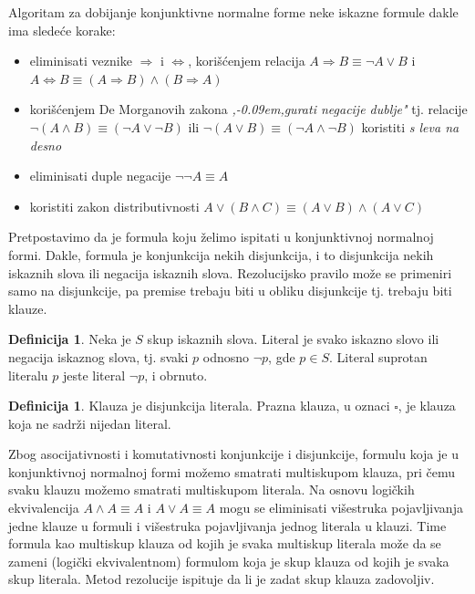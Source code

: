 \documentclass[12pt, a4paper, titlepage, twoside]{article}
\theoremstyle{definition}
\newtheorem{defn}[theorem]{Definicija}
\def\zn{,\kern-0.09em,}
\begin{document}
Algoritam za dobijanje konjunktivne normalne forme neke iskazne formule
dakle ima slede\'ce korake:
\begin{itemize}
	\item eliminisati veznike $\Rightarrow$ i $\Leftrightarrow$, kori\v s\'cenjem relacija $A \Rightarrow B \equiv \neg A \lor B$ i $A \Leftrightarrow B \equiv (A \Rightarrow B) \land (B \Rightarrow A)$
	\item kori\v s\'cenjem De Morganovih zakona \emph{\zn gurati negacije dublje"} tj. relacije $\neg (A \land B) \equiv (\neg A \lor \neg B)$ ili $\neg (A \lor B) \equiv (\neg A \land \neg B)$ koristiti \emph{s leva na desno}
	\item eliminisati duple negacije $\neg \neg A \equiv A$
	\item koristiti zakon distributivnosti $A \lor (B \land C) \equiv (A \lor B) \land (A \lor C)$
\end{itemize}


Pretpostavimo da je formula koju \v zelimo ispitati u konjunktivnoj normalnoj formi. Dakle, 
formula je konjunkcija nekih disjunkcija, i to disjunkcija nekih iskaznih slova ili 
negacija iskaznih slova. Rezolucijsko pravilo mo\v ze se primeniri samo na disjunkcije, 
pa premise trebaju biti u obliku disjunkcije tj. trebaju biti klauze.


\begin{defn}
Neka je $S$ skup iskaznih slova. Literal je svako iskazno slovo ili negacija iskaznog slova, tj. 
svaki $p$ odnosno $\neg p$, gde $p \in S$. Literal suprotan literalu $p$ jeste literal $\neg p$, 
i obrnuto.
\end{defn}


\begin{defn}
Klauza je disjunkcija literala. Prazna klauza, u oznaci $\square$, je klauza koja ne sadr\v zi 
nijedan literal.
\end{defn}


Zbog asocijativnosti i komutativnosti konjunkcije i disjunkcije,
formulu koja je u konjunktivnoj normalnoj formi mo\v zemo smatrati multiskupom
klauza, pri \v cemu svaku klauzu mo\v zemo smatrati multiskupom literala.
Na osnovu logi\v ckih ekvivalencija $A \land A \equiv A$ i $A \lor A \equiv A$
mogu se eliminisati
vi\v sestruka pojavljivanja jedne klauze u formuli i vi\v sestruka pojavljivanja
jednog literala u klauzi. Time formula kao multiskup klauza od kojih je svaka
multiskup literala mo\v ze da se zameni (logi\v cki ekvivalentnom) formulom koja
je skup klauza od kojih je svaka skup literala. Metod rezolucije ispituje da li je
zadat skup klauza zadovoljiv.
\end{document}
